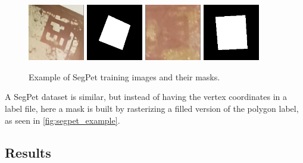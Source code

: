 \documentclass[10pt]{book}
\newcommand{\figureref}[1]{\autoref{#1}}
\begin{document}

\begin{figure}
  \centering
     {\includegraphics[width=0.22\textwidth]{image/segpet_example_in}}
     {\includegraphics[width=0.22\textwidth]{image/segpet_example_seg}}
     {\includegraphics[width=0.22\textwidth]{image/segpet_example_2_in}}
     {\includegraphics[width=0.22\textwidth]{image/segpet_example_2_seg}}
  \caption{Example of SegPet training images and their masks.}
  \label{fig:segpet_example}
\end{figure}

A SegPet dataset is similar, but instead of having the vertex coordinates in a label file, here a mask is built by rasterizing a filled version of the polygon label, as seen in \figureref{fig:segpet_example}.

\subsection{Results}
\end{document}
